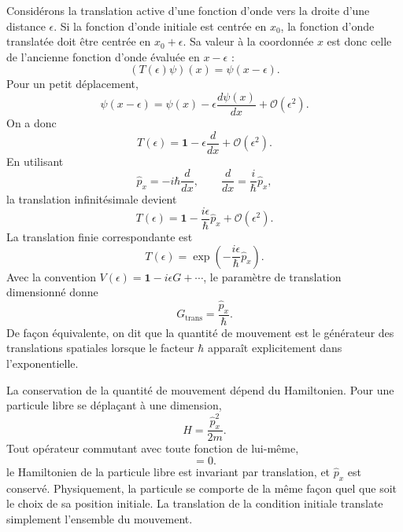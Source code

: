 Considérons la translation active d’une fonction d’onde vers la droite d’une distance \(\epsilon\). Si la fonction d’onde initiale est centrée en \(x_0\), la fonction d’onde translatée doit être centrée en \(x_0+\epsilon\). Sa valeur à la coordonnée \(x\) est donc celle de l’ancienne fonction d’onde évaluée en \(x-\epsilon\) :
\begin{equation}
(T(\epsilon)\psi)(x)=\psi(x-\epsilon).
\end{equation}
Pour un petit déplacement,
\begin{equation}
\psi(x-\epsilon)
=
\psi(x)-\epsilon\frac{d\psi(x)}{dx}
+\mathcal O(\epsilon^2).
\end{equation}
On a donc
\begin{equation}
T(\epsilon)
=
\mathbf 1-\epsilon\frac{d}{dx}
+\mathcal O(\epsilon^2).
\end{equation}
En utilisant
\begin{equation}
\hat p_x=-i\hbar\frac{d}{dx},
\qquad
\frac{d}{dx}=\frac{i}{\hbar}\hat p_x,
\end{equation}
la translation infinitésimale devient
\begin{equation}
T(\epsilon)
=
\mathbf 1-\frac{i\epsilon}{\hbar}\hat p_x
+\mathcal O(\epsilon^2).
\end{equation}
La translation finie correspondante est
\begin{equation}
T(\epsilon)
=
\exp\left(-\frac{i\epsilon}{\hbar}\hat p_x\right).
\end{equation}
Avec la convention \(V(\epsilon)=\mathbf 1-i\epsilon G+\cdots\), le paramètre de translation dimensionné donne
\begin{equation}
G_{\mathrm{trans}}=\frac{\hat p_x}{\hbar}.
\end{equation}
De façon équivalente, on dit que la quantité de mouvement est le générateur des translations spatiales lorsque le facteur \(\hbar\) apparaît explicitement dans l’exponentielle.

\begin{classroomqa}
\end{classroomqa}

La conservation de la quantité de mouvement dépend du Hamiltonien. Pour une particule libre se déplaçant à une dimension,
\begin{equation}
H=\frac{\hat p_x^2}{2m}.
\end{equation}
Tout opérateur commutant avec toute fonction de lui-même,
\begin{equation}
[H,\hat p_x]=0.
\end{equation}
le Hamiltonien de la particule libre est invariant par translation, et \(\hat p_x\) est conservé. Physiquement, la particule se comporte de la même façon quel que soit le choix de sa position initiale. La translation de la condition initiale translate simplement l’ensemble du mouvement.

